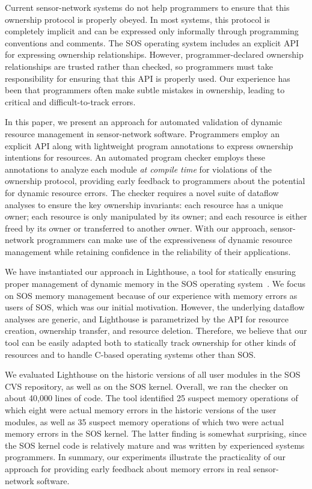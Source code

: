 Current sensor-network systems do not help programmers to ensure that
this ownership protocol is properly obeyed.  In most systems, this
protocol is completely implicit and can be expressed only informally
through programming conventions and comments.  The SOS operating
system includes an explicit API for expressing ownership
relationships.  However, programmer-declared ownership relationships
are trusted rather than checked, so programmers must take responsibility for
ensuring that this API is properly used.  Our experience has been that
programmers often make subtle mistakes in ownership,
leading to critical and difficult-to-track errors.  

In this paper, we present an approach for automated validation of dynamic
resource management in sensor-network software.  Programmers employ an
explicit API along with lightweight program annotations to express
ownership intentions for resources.  An automated program checker employs these
annotations to analyze each module {\em
at compile time} for violations of the ownership protocol, providing
early feedback to programmers about the potential for dynamic resource
errors.  The checker requires a novel suite of dataflow analyses to ensure
the key ownership invariants:  each resource has a unique owner; each
resource is only manipulated by its owner; and each resource is either
freed by its owner or transferred to another owner.  With our approach,
sensor-network programmers can make use of the expressiveness of
dynamic resource management while retaining confidence in the
reliability of their applications.

We have instantiated our approach in Lighthouse, a tool for statically ensuring
proper management of dynamic memory in the SOS operating
system~\cite{sos}. 
We focus on SOS memory management because of our experience with
memory errors as users of SOS, which was our initial motivation.
However, the underlying dataflow analyses are generic, and Lighthouse is
parametrized by the API for resource creation, ownership transfer, and
resource deletion.  Therefore, we believe that our tool can be easily
adapted both to statically track ownership for other kinds of
resources and to handle C-based operating systems other than SOS.

We evaluated Lighthouse on the historic versions of all user modules in
the SOS CVS repository, as well as on the SOS kernel.  Overall, we ran
the checker on about 40,000 lines of code.  The tool identified 25
suspect memory operations of which eight were actual memory errors in the
historic versions of the user modules, as well as 35 suspect memory
operations of which two were actual memory errors in the SOS kernel.
The latter finding is somewhat surprising, since the SOS kernel code
is relatively mature and was written by experienced systems programmers.
In summary, our experiments illustrate the practicality of our
approach for providing early feedback about memory errors in real
sensor-network software.

